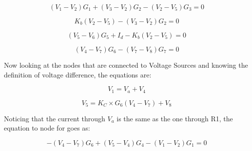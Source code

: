 \begin{equation}
  (V_1-V_2)G_1 + (V_3-V_2)G_2 - (V_2-V_5)G_3 = 0
  \label{eq:Node2}
\end{equation}

\begin{equation}
  K_b(V_2-V_5) - (V_3-V_2)G_2 = 0
  \label{eq:Node3}
\end{equation}

\begin{equation}
  (V_5-V_6)G_5 + I_d - K_b(V_2-V_5) = 0
  \label{eq:Node6}
\end{equation}

\begin{equation}
  (V_4-V_7)G_6 - (V_7-V_8)G_7 = 0
  \label{eq:Node7}
\end{equation}

Now looking at the nodes that are connected to Voltage Sources and knowing the definition of voltage difference, the equations are:

\begin{equation}
  V_1 = V_a + V_4
  \label{eq:Node1}
\end{equation}

\begin{equation}
  V_5= K_C \times G_6(V_4-V_7) + V_8
  \label{eq:Node5}
\end{equation}

Noticing that the current through $V_a$ is the same as the one through R1, the equation to node for goes as:

\begin{equation}
  -(V_4-V_7)G_6 + (V_5-V_4)G_4 - (V_1-V_2)G_1 = 0
  \label{eq:Node5}
\end{equation}

